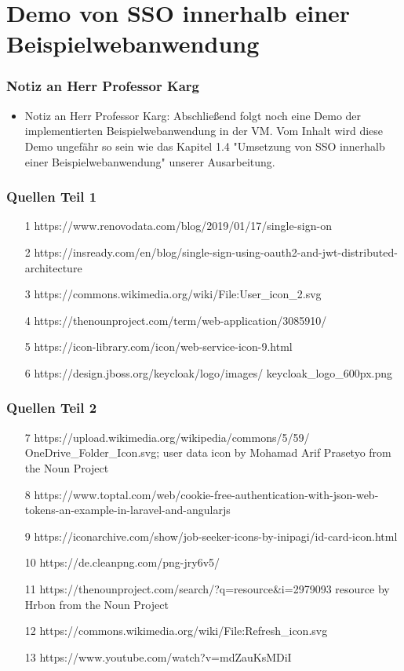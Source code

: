 \documentclass{beamer}
\begin{document}
\section{Demo von SSO innerhalb einer Beispielwebanwendung}

\begin{frame}
\frametitle{Notiz an Herr Professor Karg}
\begin{itemize}
\item Notiz an Herr Professor Karg: Abschließend folgt noch eine Demo der implementierten Beispielwebanwendung in der VM. Vom Inhalt wird diese Demo ungefähr so sein wie das Kapitel 1.4 "Umsetzung von SSO innerhalb einer Beispielwebanwendung" unserer Ausarbeitung.
\end{itemize}
\end{frame}


\begin{frame}
\frametitle{Quellen Teil 1}
\begin{itemize}
\item [1] https://www.renovodata.com/blog/2019/01/17/single-sign-on
\item [2] https://insready.com/en/blog/single-sign-using-oauth2-and-jwt-distributed-architecture
\item [3] https://commons.wikimedia.org/wiki/File:User\_icon\_2.svg
\item [4] https://thenounproject.com/term/web-application/3085910/
\item [5] https://icon-library.com/icon/web-service-icon-9.html
\item [6] https://design.jboss.org/keycloak/logo/images/ keycloak\_logo\_600px.png
\end{itemize}
\end{frame}

\begin{frame}
\frametitle{Quellen Teil 2}
\begin{itemize}
\item [7] https://upload.wikimedia.org/wikipedia/commons/5/59/ OneDrive\_Folder\_Icon.svg; user data icon by Mohamad Arif Prasetyo from the Noun Project
\item [8] https://www.toptal.com/web/cookie-free-authentication-with-json-web-tokens-an-example-in-laravel-and-angularjs
\item [9] https://iconarchive.com/show/job-seeker-icons-by-inipagi/id-card-icon.html
\item [10] https://de.cleanpng.com/png-jry6v5/
\item [11] https://thenounproject.com/search/?q=resource\&i=2979093 resource by Hrbon from the Noun Project
\item [12] https://commons.wikimedia.org/wiki/File:Refresh\_icon.svg
\item [13] https://www.youtube.com/watch?v=mdZauKsMDiI
\end{itemize}
\end{frame}
\end{document}
